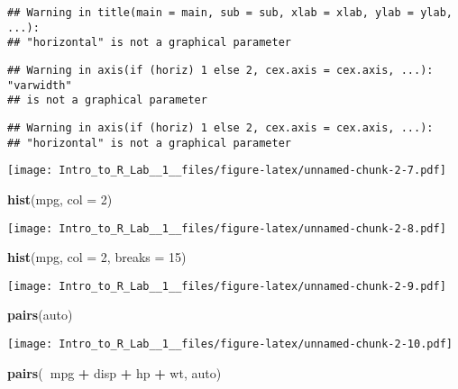 \documentclass[]{article}
\newenvironment{Shaded}{\begin{snugshade}}{\end{snugshade}}
\newcommand{\KeywordTok}[1]{\textcolor[rgb]{0.13,0.29,0.53}{\textbf{#1}}}
\newcommand{\DataTypeTok}[1]{\textcolor[rgb]{0.13,0.29,0.53}{#1}}
\newcommand{\DecValTok}[1]{\textcolor[rgb]{0.00,0.00,0.81}{#1}}
\newcommand{\StringTok}[1]{\textcolor[rgb]{0.31,0.60,0.02}{#1}}
\newcommand{\OperatorTok}[1]{\textcolor[rgb]{0.81,0.36,0.00}{\textbf{#1}}}
\newcommand{\NormalTok}[1]{#1}
\begin{document}
\begin{verbatim}
## Warning in title(main = main, sub = sub, xlab = xlab, ylab = ylab, ...):
## "horizontal" is not a graphical parameter
\end{verbatim}

\begin{verbatim}
## Warning in axis(if (horiz) 1 else 2, cex.axis = cex.axis, ...): "varwidth"
## is not a graphical parameter
\end{verbatim}

\begin{verbatim}
## Warning in axis(if (horiz) 1 else 2, cex.axis = cex.axis, ...):
## "horizontal" is not a graphical parameter
\end{verbatim}

\texttt{[image: Intro\_to\_R\_Lab\_\_1\_\_files/figure-latex/unnamed-chunk-2-7.pdf]}

\begin{Shaded}
\begin{Highlighting}[]
\KeywordTok{hist}\NormalTok{(mpg, }\DataTypeTok{col =} \DecValTok{2}\NormalTok{)}
\end{Highlighting}
\end{Shaded}

\texttt{[image: Intro\_to\_R\_Lab\_\_1\_\_files/figure-latex/unnamed-chunk-2-8.pdf]}

\begin{Shaded}
\begin{Highlighting}[]
\KeywordTok{hist}\NormalTok{(mpg, }\DataTypeTok{col =} \DecValTok{2}\NormalTok{, }\DataTypeTok{breaks =} \DecValTok{15}\NormalTok{)}
\end{Highlighting}
\end{Shaded}

\texttt{[image: Intro\_to\_R\_Lab\_\_1\_\_files/figure-latex/unnamed-chunk-2-9.pdf]}

\begin{Shaded}
\begin{Highlighting}[]
\KeywordTok{pairs}\NormalTok{(auto)}
\end{Highlighting}
\end{Shaded}

\texttt{[image: Intro\_to\_R\_Lab\_\_1\_\_files/figure-latex/unnamed-chunk-2-10.pdf]}

\begin{Shaded}
\begin{Highlighting}[]
\KeywordTok{pairs}\NormalTok{(}\OperatorTok{~}\NormalTok{mpg }\OperatorTok{+}\StringTok{ }\NormalTok{disp }\OperatorTok{+}\StringTok{ }\NormalTok{hp }\OperatorTok{+}\StringTok{ }\NormalTok{wt, auto)}
\end{Highlighting}
\end{Shaded}
\end{document}
